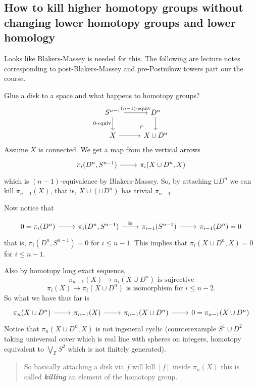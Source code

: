 \subsection*{How to kill higher homotopy groups without changing lower homotopy groups and lower homology}

{\color{cyan}Looks like Blakers-Massey is needed for this. The following are lecture notes corresponding to post-Blakers-Massey and pre-Postnikow towers part our the course.}

Glue a disk to a space and what happens to homotopy groups?
\[\begin{tikzcd}
	S^{n-1}\arrow[r,"(n-1)\text{-equiv}"]\arrow[d,"0\text{-equiv}",swap]&D^n\arrow[d]\\
	X\arrow[r]&X\cup D^n\arrow[ul, phantom, "\ulcorner", very near start]
\end{tikzcd}\]
Assume $X$ is connected. We get a map from the vertical arrows
\[\begin{tikzcd}
	\pi_i(D^n,S^{n-1})\arrow[r]&\pi_i(X\cup D^n,X)
\end{tikzcd}\]
which is $(n-1)$-equivalence by Blakers-Massey. So, by attaching $\sqcup D^n$ we can kill $\pi_{n-1}(X)$, that is, $X\cup(\sqcup D^n)$ has trivial $\pi_{n-1}$.

Now notice that

\[\begin{tikzcd}
	0=\pi_i(D^n)\arrow[r]&\pi_i(D^n,S^{n-1})\arrow[r,"\cong"]&\pi_{i-1}(S^{n-1})\arrow[r]&\pi_{i-1}(D^n)=0
\end{tikzcd}\]
that is, $\pi_i(D^n,S^{n-1})=0$ for $i\leq n-1$. This implies that $\pi_i(X\cup D^n,X)=0$ for $i\leq n-1$.

Also by homotopy long exact sequence,
\[\pi_{n-1}(X)\to \pi_i(X\cup D^n)\text{ is sujrective}\]
\[\pi_i(X)\to \pi_{i}(X\cup D^n)\text{ is isomorphism for }i\leq n-2.\]
So what we have thus far is
\[\begin{tikzcd}
	\pi_n(X\cup D^n)\arrow[r]&\pi_{n-1}(X)\arrow[r]&\pi_{n-1}(X\cup D^n)\arrow[r]&0=\pi_{n-1}(X\cup D^n)
\end{tikzcd}\]
Notice that $\pi_n(X\cup D^n,X)$ is not ingeneral cyclic (counterexample $S^1\cup D^2$ taking unieversal cover which is real line with spheres on integers, homotopy equivalent to $\bigvee_\mathbb{Z} S^2$ which is not finitely generated).

\begin{quote}
	{\color{red} So basically attaching a disk via $f$ will kill $[f]$ inside $\pi_n(X)$ this is called \textbf{\textit{killing}} an element of the homotopy group.}
\end{quote}

